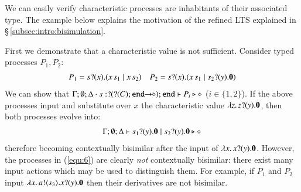 We can easily verify characteristic processes are inhabitants of their associated type. 
The example below explains the motivation of the refined 
LTS explained in \S\,\ref{subsec:intro:bisimulation}.
\smallskip  

\begin{example}
\label{ex:motivation}
First we demonstrate that a characteristic value is not sufficient. 
Consider typed processes $P_1, P_2$:
%
\begin{eqnarray}
	P_1 = \binp{s}{x} (\appl{x}{s_1} \Par \appl{x}{s_2}) 
	& & 
	P_2 = \binp{s}{x} (\appl{x}{s_1} \Par \binp{s_2}{y} \inact) 
	\label{equ:6}
\end{eqnarray}
%
We can show that $\Gamma; \emptyset; \Delta \cdot s: ? (? (C) ; \mathtt{end}\!\! \rightarrow\!\! \diamond) ; \mathtt{end} \vdash P_i \triangleright \diamond$ ($i \in \{1,2\}$).
If the above processes input and substitute over $x$
the characteristic value $\lambda z.\,z ? (y) . \mathbf{0}$, 
then both processes evolve into:%
%
\begin{eqnarray*}
	\Gamma; \emptyset; \Delta \vdash s_1 ? (y) . \mathbf{0} \;|\; s_2 ? (y) . \mathbf{0} \triangleright \diamond
\end{eqnarray*}
%
therefore becoming 
contextually bisimilar after the input of
$\lambda x.\,x ? (y) . \mathbf{0}$.
However, the processes in (\ref{equ:6}) 
are clearly {\em not} contextually bisimilar: there exist many input actions
which may be used to distinguish them.
For example, if 
$P_1$ and $P_2$ input 
 $\lambda x.\,a ! \langle s_3 \rangle . x ? (y) . \mathbf{0}$ then
their derivatives are not bisimilar. 


\end{example}
